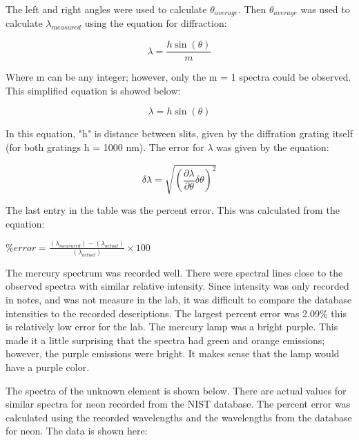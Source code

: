 \documentclass[singlecolumn, amsmath]{revtex4}
\begin{document}
	The left and right angles were used to calculate $\theta_{average}$. Then $\theta_{average}$ was used to calculate $\lambda_{measured}$ using the equation for diffraction:

\begin{equation}
\lambda = \frac{h\sin(\theta)}{m}
\end{equation}

	Where m can be any integer; however, only the m = 1 spectra could be observed. This simplified equation is showed below:

\begin{equation}
\lambda = h\sin(\theta)
\end{equation}

	In this equation, "h" is distance between slits, given by the diffration grating itself (for both gratings h = 1000 nm). The error for $\lambda$ was given by the equation:

\begin{equation}
\delta\lambda = \sqrt{(\frac{\partial\lambda}{\partial\theta}\delta\theta)^2}
\end{equation}

	The last entry in the table was the percent error. This was calculated from the equation:

\begin{center}
$\%error = \frac{(\lambda_{measured}) - (\lambda_{actual})}{(\lambda_{actual})}\times100$
\end{center}

	The mercury spectrum was recorded well. There were spectral lines close to the observed spectra with similar relative intensity. Since intensity was only recorded in notes, and was not measure in the lab, it was difficult to compare the database intensities to the recorded descriptions. The largest percent error was 2.09\% this is relatively low error for the lab. The mercury lamp was a bright purple. This made it a little surprising that the spectra had green and orange emissions; however, the purple emissions were bright. It makes sense that the lamp would have a purple color.

	The spectra of the unknown element is shown below. There are actual values for similar spectra for neon recorded from the NIST database. The percent error was calculated using the recorded wavelengths and the wavelengths from the database for neon. The data is shown here: 
\end{document}
